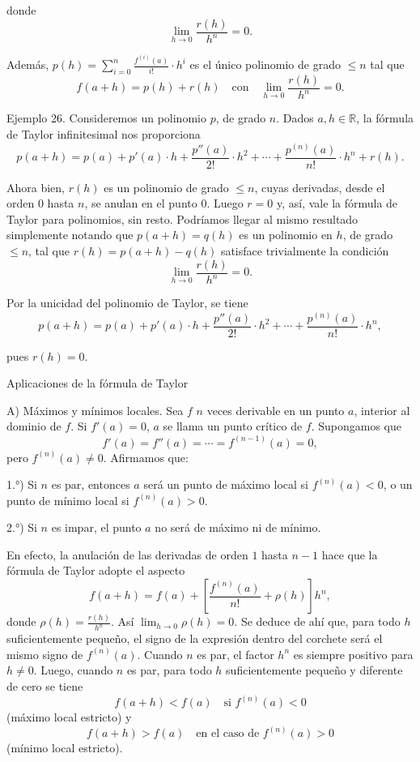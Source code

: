 \documentclass[12pt,oneside]{book}
\begin{document}
donde
\[
\lim_{h \to 0} \frac{r(h)}{h^n} = 0.
\]

Además, \( p(h) = \sum_{i=0}^n \frac{f^{(i)}(a)}{i!} \cdot h^i \) es el único polinomio de grado \( \leq n \) tal que
\[
f(a + h) = p(h) + r(h) \quad \text{con} \quad \lim_{h \to 0} \frac{r(h)}{h^n} = 0.
\]

Ejemplo 26. Consideremos un polinomio \( p \), de grado \( n \). Dados \( a, h \in \mathbb{R} \), la fórmula de Taylor infinitesimal nos proporciona
\[
p(a + h) = p(a) + p'(a) \cdot h + \frac{p''(a)}{2!} \cdot h^2 + \cdots + \frac{p^{(n)}(a)}{n!} \cdot h^n + r(h).
\]

Ahora bien, \( r(h) \) es un polinomio de grado \( \leq n \), cuyas derivadas, desde el orden \( 0 \) hasta \( n \), se anulan en el punto \( 0 \). Luego \( r = 0 \) y, así, vale la fórmula de Taylor para polinomios, sin resto. Podríamos llegar al mismo resultado simplemente notando que \( p(a + h) = q(h) \) es un polinomio en \( h \), de grado \( \leq n \), tal que \( r(h) = p(a + h) - q(h) \) satisface trivialmente la condición
\[
\lim_{h \to 0} \frac{r(h)}{h^n} = 0.
\]

Por la unicidad del polinomio de Taylor, se tiene
\[
p(a + h) = p(a) + p'(a) \cdot h + \frac{p''(a)}{2!} \cdot h^2 + \cdots + \frac{p^{(n)}(a)}{n!} \cdot h^n,
\]

pues \( r(h) = 0 \).

Aplicaciones de la fórmula de Taylor

A) Máximos y mínimos locales. Sea \( f \) \( n \) veces derivable en un punto \( a \), interior al dominio de \( f \). Si \( f'(a) = 0 \), \( a \) se llama un punto crítico de \( f \). Supongamos que
\[
f'(a) = f''(a) = \cdots = f^{(n-1)}(a) = 0,
\]
pero \( f^{(n)}(a) \neq 0 \). Afirmamos que:

1.°) Si \( n \) es par, entonces \( a \) será un punto de máximo local si \( f^{(n)}(a) < 0 \), o un punto de mínimo local si \( f^{(n)}(a) > 0 \).

2.°) Si \( n \) es impar, el punto \( a \) no será de máximo ni de mínimo.

En efecto, la anulación de las derivadas de orden \( 1 \) hasta \( n-1 \) hace que la fórmula de Taylor adopte el aspecto
\[
f(a+h) = f(a) + \left[ \frac{f^{(n)}(a)}{n!} + \rho(h) \right] h^n,
\]
donde \( \rho(h) = \frac{r(h)}{h^n} \). Así \( \lim_{h \to 0} \rho(h) = 0 \). Se deduce de ahí que, para todo \( h \) suficientemente pequeño, el signo de la expresión dentro del corchete será el mismo signo de \( f^{(n)}(a) \). Cuando \( n \) es par, el factor \( h^n \) es siempre positivo para \( h \neq 0 \). Luego, cuando \( n \) es par, para todo \( h \) suficientemente pequeño y diferente de cero se tiene
\[
f(a+h) < f(a) \quad \text{si } f^{(n)}(a) < 0
\]
(máximo local estricto) y
\[
f(a+h) > f(a) \quad \text{en el caso de } f^{(n)}(a) > 0
\]
(mínimo local estricto).
\end{document}
